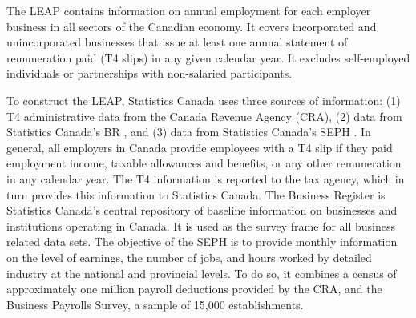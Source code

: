
The \ac{LEAP} \citep{StatisticsCanada2019} contains information on annual employment for each employer business in all sectors of the Canadian economy. It covers incorporated and unincorporated businesses that issue at least one annual statement of remuneration paid (T4 slips) in any given calendar year. It excludes self-employed individuals or partnerships with non-salaried participants.

To construct the \ac{LEAP}, Statistics Canada uses three sources of information: (1) T4 administrative data  from the Canada Revenue Agency (CRA), (2) data from Statistics Canada's \acl{BR} \citep{StatisticsCanada2019a}, and (3) data from  Statistics Canada's \acf{SEPH} \citep{StatisticsCanada2019b}. 
%
In general, all employers in Canada provide employees with a T4 slip if they paid employment income, taxable allowances and benefits, or any other remuneration in any calendar year. The T4 information is reported to the tax agency, which in turn provides this information to Statistics Canada. 
%
The Business Register is Statistics Canada's central repository of baseline information on businesses and institutions operating in Canada. It is used as the survey frame for all business related data sets.
%
The objective of the \ac{SEPH} is to provide monthly information on the level of earnings, the number of jobs, and hours worked by detailed industry at the national and provincial levels. To do so, it combines a census of approximately one million payroll deductions provided by the CRA, and the Business Payrolls Survey, a sample of 15,000 establishments.  

